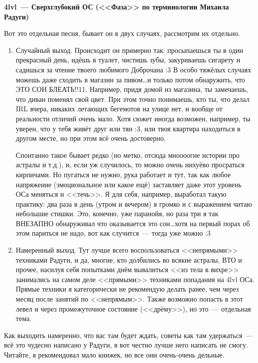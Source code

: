 \documentclass[a5paper,12pt,twoside]{memoir}
\begin{document}
\begin{center}
\textbf{4lvl~--- Сверхглубокий ОС (<<Фаза>> по терминологии Михаила Радуги)}
\end{center}

Вот это отдельная песня, бывает он в двух случаях, рассмотрим их отдельно.
\begin{enumerate}
\item Случайный выход. Происходит он примерно так: просыпаешься ты в один прекрасный день, идёшь в туалет, чистишь зубы, закуриваешь сигарету и садишься за чтение твоего любимого Доброчана :3 В особо тяжёлых случаях можешь даже сходить в магазин за пивом\ldots и только потом обнаружить, что ЭТО СОН БЛЕАТЬ!!11. Например, придя домой из магазина, ты замечаешь, что диван поменял свой цвет. При этом точно понимаешь, кто ты, что делал IRL вчера, никаких летающих бегемотов на улице нет, и вообще от реальности отличий очень мало. Хотя сюжет иногда возможен, например, ты уверен, что у тебя живёт друг или тян :3, или твоя квартира находиться в другом месте, но при этом всё очень достоверно.

Спонтанно такое бывает редко (но метко, отсюда мноооогие истории про астралы и т.д.), и, если уж случилось, то можно очень нихуёво просраться кирпичами. Но пугаться не нужно, рука работает и тут, так как любое напряжение (эмоциональное или какое ещё) заставляет даже этот уровень ОСа меняться и <<течь>>. Я для себя, например, выработал такую практику: два раза в день (утром и вечером) я громко и с выражением читаю небольшие стишки. Это, конечно, уже паранойя, но раза три я так ВНЕЗАПНО обнаруживал что оказывается это сон\ldots хотя на первый порах об этом париться не надо, вот как случится~--- тогда уже можно :3
\item Намеренный выход. Тут лучше всего воспользоваться <<непрямыми>> техниками Радуги, и да, многие, кто долбились во всякие астралы, ВТО и прочее, насилуя себя попытками днём вывалиться <<из тела в вихре>> занимались на самом деле <<прямыми>> техниками попадания на 4lvl ОСа. Прямые техники я категорически не рекомендую делать ранее, чем через месяц после занятий по <<непрямым>>. Также возможно попасть в этот левел и через промежуточное состояние (<<дрёму>>), но это~--- отдельная тема.
\end{enumerate} 
 
Как выходить намеренно, что вас там будет ждать, советы как там удержаться~--- всё это чудесно написано у Радуги, я вот честно лучше него написать не смогу. Читайте, я рекомендовал мало книжек, но все они очень-очень дельные.
\end{document}

